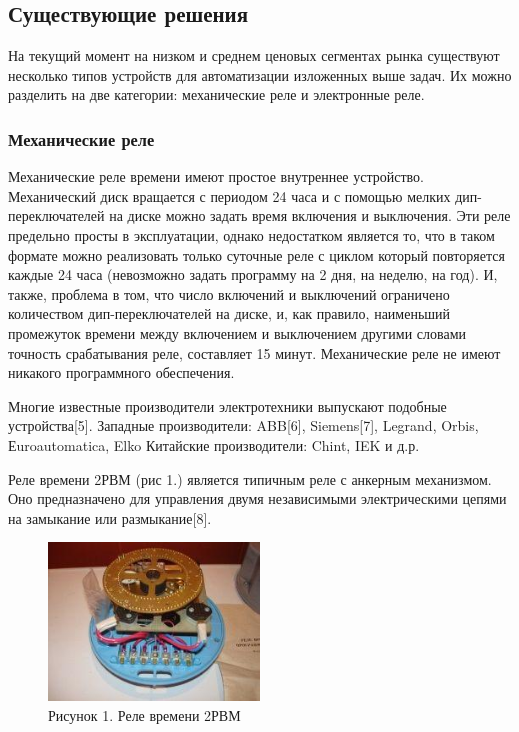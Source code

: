 \subsection{Существующие решения}
На текущий момент на низком и среднем ценовых сегментах рынка существуют несколько типов устройств для автоматизации изложенных выше задач. Их можно разделить на две категории: механические реле и электронные реле.

\subsubsection{Механические реле}
Механические реле времени имеют простое внутреннее устройство. Механический диск вращается с периодом 24 часа и с помощью мелких дип-переключателей на диске можно задать время включения и выключения. Эти реле предельно просты в эксплуатации, однако недостатком является то, что в таком формате можно реализовать только суточные реле с циклом который повторяется каждые 24 часа (невозможно задать программу на 2 дня, на неделю, на год). И, также, проблема в том, что число включений и выключений ограничено количеством дип-переключателей на диске, и, как правило, наименьший промежуток времени между включением и выключением другими словами точность срабатывания реле, составляет 15 минут. Механические реле не имеют никакого программного обеспечения.

Многие известные производители электротехники выпускают подобные устройства[5]. 
Западные производители: ABB[6], Siemens[7], Legrand, Orbis, Еuroautomatica, Elko
Китайские производители: Chint, IEK и д.р.

Реле времени 2РВМ (рис 1.) является типичным реле с анкерным механизмом. Оно предназначено для управления двумя независимыми электрическими цепями на замыкание или размыкание[8].

\begin{figure}[h!]
    \centering
    \includegraphics[width=0.5\textwidth]{mechanical_rele.png}
    \caption{Рисунок 1. Реле времени 2РВМ}
\end{figure}


